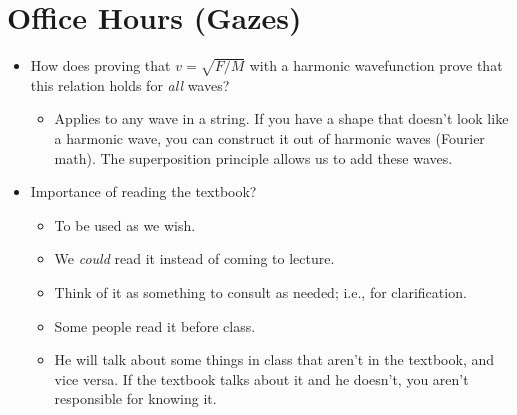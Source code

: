 \documentclass[../notes.tex]{subfiles}
\begin{document}
\section{Office Hours (Gazes)}
\begin{itemize}
    \item How does proving that $v=\sqrt{F/M}$ with a harmonic wavefunction prove that this relation holds for \emph{all} waves?
    \begin{itemize}
        \item Applies to any wave in a string. If you have a shape that doesn't look like a harmonic wave, you can construct it out of harmonic waves (Fourier math). The superposition principle allows us to add these waves.
    \end{itemize}
    \item Importance of reading the textbook?
    \begin{itemize}
        \item To be used as we wish.
        \item We \emph{could} read it instead of coming to lecture.
        \item Think of it as something to consult as needed; i.e., for clarification.
        \item Some people read it before class.
        \item He will talk about some things in class that aren't in the textbook, and vice versa. If the textbook talks about it and he doesn't, you aren't responsible for knowing it.
    \end{itemize}
\end{itemize}
\end{document}
